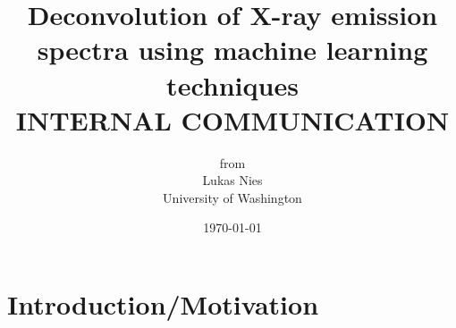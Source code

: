 \documentclass[12pt]{article}
\begin{document}
	
	\title{
		\Large{Deconvolution of X-ray emission spectra using machine learning techniques} \\[1cm]
		\small{INTERNAL COMMUNICATION}
	}
	\author{from \\ Lukas Nies \\ University of Washington}
	\date{\today}
	\clearpage\maketitle\thispagestyle{empty}
	

\section{Introduction/Motivation}
\end{document}
